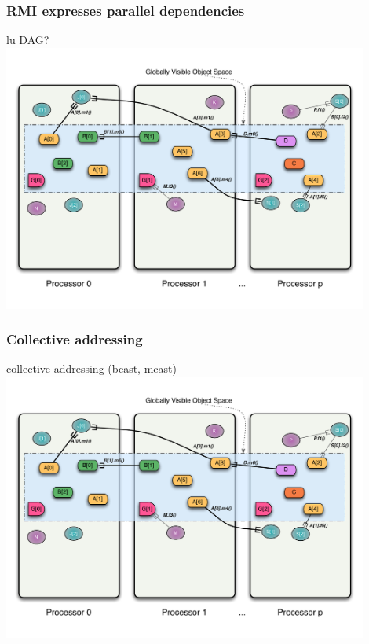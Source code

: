 \begin{frame}
\frametitle{RMI expresses parallel dependencies}
	\begin{center}
        lu DAG?
        \includegraphics[width=0.9\textwidth]{../figures/progmodel/11-global-methods.pdf}
	\end{center}
\end{frame}


\begin{frame}
\frametitle{Collective addressing}
	\begin{center}
        collective addressing (bcast, mcast)
        \includegraphics[width=0.9\textwidth]{../figures/progmodel/11-global-methods.pdf}
	\end{center}
\end{frame}



